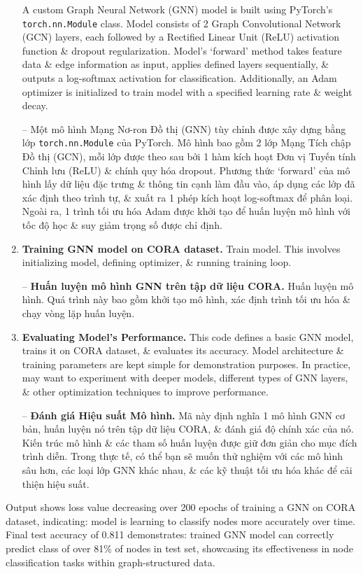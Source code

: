 \documentclass{article}
\begin{document}
\begin{enumerate}
    A custom Graph Neural Network (GNN) model is built using PyTorch's {\tt torch.nn.Module} class. Model consists of 2 Graph Convolutional Network (GCN) layers, each followed by a Rectified Linear Unit (ReLU) activation function \& dropout regularization. Model's `forward' method takes feature data \& edge information as input, applies defined layers sequentially, \& outputs a log-softmax activation for classification. Additionally, an Adam optimizer is initialized to train model with a specified learning rate \& weight decay.

    -- Một mô hình Mạng Nơ-ron Đồ thị (GNN) tùy chỉnh được xây dựng bằng lớp {\tt torch.nn.Module} của PyTorch. Mô hình bao gồm 2 lớp Mạng Tích chập Đồ thị (GCN), mỗi lớp được theo sau bởi 1 hàm kích hoạt Đơn vị Tuyến tính Chỉnh lưu (ReLU) \& chính quy hóa dropout. Phương thức `forward' của mô hình lấy dữ liệu đặc trưng \& thông tin cạnh làm đầu vào, áp dụng các lớp đã xác định theo trình tự, \& xuất ra 1 phép kích hoạt log-softmax để phân loại. Ngoài ra, 1 trình tối ưu hóa Adam được khởi tạo để huấn luyện mô hình với tốc độ học \& suy giảm trọng số được chỉ định.
    \item {\bf Training GNN model on CORA dataset.} Train model. This involves initializing model, defining optimizer, \& running training loop.

    -- {\bf Huấn luyện mô hình GNN trên tập dữ liệu CORA.} Huấn luyện mô hình. Quá trình này bao gồm khởi tạo mô hình, xác định trình tối ưu hóa \& chạy vòng lặp huấn luyện.
    \item {\bf Evaluating Model's Performance.} This code defines a basic GNN model, trains it on CORA dataset, \& evaluates its accuracy. Model architecture \& training parameters are kept simple for demonstration purposes. In practice, may want to experiment with deeper models, different types of GNN layers, \& other optimization techniques to improve performance.

    -- {\bf Đánh giá Hiệu suất Mô hình.} Mã này định nghĩa 1 mô hình GNN cơ bản, huấn luyện nó trên tập dữ liệu CORA, \& đánh giá độ chính xác của nó. Kiến trúc mô hình \& các tham số huấn luyện được giữ đơn giản cho mục đích trình diễn. Trong thực tế, có thể bạn sẽ muốn thử nghiệm với các mô hình sâu hơn, các loại lớp GNN khác nhau, \& các kỹ thuật tối ưu hóa khác để cải thiện hiệu suất.
\end{enumerate}
Output shows loss value decreasing over 200 epochs of training a GNN on CORA dataset, indicating: model is learning to classify nodes more accurately over time. Final test accuracy of 0.811 demonstrates: trained GNN model can correctly predict class of over 81\% of nodes in test set, showcasing its effectiveness in node classification tasks within graph-structured data.
\end{document}
